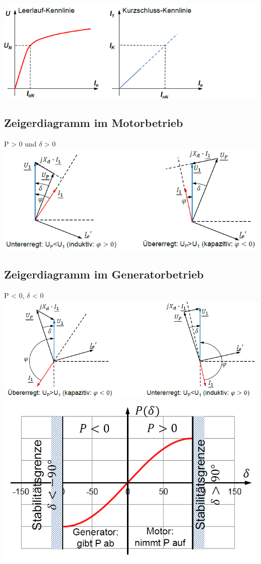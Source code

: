     \includegraphics[scale = 0.8]{images/KennlinieSynchronmaschine}

\subsection{Zeigerdiagramm im Motorbetrieb}
    P > 0 und $\delta$ > 0 \newline \newline
    \includegraphics[width = 12 cm]{images/ZeigerdiagrammSynchronmaschine}

\subsection{Zeigerdiagramm im Generatorbetrieb}
    P < 0, $\delta$ < 0  \newline
    \includegraphics[width = 12 cm]{images/ZeigerdiagrammGeneratorbetrieb} \newline \newline
    \includegraphics[scale = 0.4]{images/Stabilitaet}



\clearpage
\pagebreak
